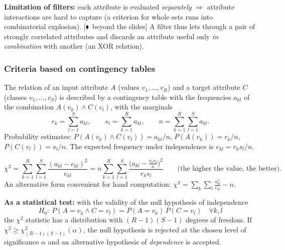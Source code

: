 \documentclass[11pt,a4paper]{article}
\theoremstyle{definition}
\newcommand{\mimo}{\textcolor{markcol}{\textsf{\footnotesize[$\blacklozenge$~beyond the slides]}}}
\begin{document}
\textbf{Limitation of filters:} each attribute is evaluated \emph{separately} $\Rightarrow$
attribute interactions are hard to capture (a criterion for whole sets runs into combinatorial
explosion). \mimo{} A filter thus lets through a pair of strongly correlated attributes and
discards an attribute useful only \emph{in combination} with another (an XOR relation).

\subsubsection{Criteria based on contingency tables}
\label{ssec:kontingencni}

The relation of an input attribute $A$ (values $v_1,\dots,v_R$) and a target attribute $C$
(classes $v_1,\dots,v_S$) is described by a contingency table with the frequencies $a_{kl}$ of
the combination $A(v_k)\wedge C(v_l)$, with the marginals
\[ r_k=\sum_{l=1}^{S}a_{kl},\qquad s_l=\sum_{k=1}^{R}a_{kl},\qquad
n=\sum_{k=1}^{R}\sum_{l=1}^{S}a_{kl}. \]
Probability estimates: $P(A(v_k)\wedge C(v_l))=a_{kl}/n$, $P(A(v_k))=r_k/n$,
$P(C(v_l))=s_l/n$. The expected frequency under independence is $e_{kl}=r_k s_l/n$.

\begin{defbox}
\[ \chi^2=\sum_{k=1}^{R}\sum_{l=1}^{S}\frac{(a_{kl}-e_{kl})^2}{e_{kl}}
   = n\sum_{k=1}^{R}\sum_{l=1}^{S}\frac{\big(a_{kl}-\tfrac{r_ks_l}{n}\big)^2}{r_ks_l}
   \qquad\text{(the higher the value, the better).}\]
An alternative form convenient for hand computation:
$\chi^2=\sum_k\sum_l \frac{a_{kl}^2}{e_{kl}}-n$.

\textbf{As a statistical test:} with the validity of the null hypothesis of independence
\[ H_0:\ P(A=v_k\wedge C=v_l)=P(A=v_k)\,P(C=v_l)\quad \forall k,l \]
the $\chi^2$ statistic has a distribution with $(R-1)(S-1)$ degrees of freedom. If
$\chi^2\ge\chi^2_{(R-1)(S-1)}(\alpha)$, the null hypothesis is rejected at the chosen level of
significance $\alpha$ and an alternative hypothesis of \emph{dependence} is accepted.
\end{defbox}
\end{document}
